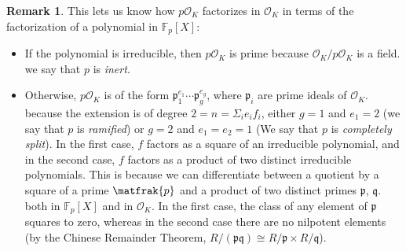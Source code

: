 \documentclass[11pt]{article}
\theoremstyle{definition}
\newtheorem{rk}[theorem]{Remark}
\begin{document}
    \begin{rk}
        This lets us know how $p\mathcal{O}_K$ factorizes in $\mathcal{O}_K$
        in terms of the factorization of a polynomial in $\mathbb{F}_p[X]$:
        \begin{itemize}
            \item If the polynomial is irreducible, then $p\mathcal{O}_K$ is prime because $\mathcal{O}_K / p \mathcal{O}_K$ is a field.
                we say that $p$ is \emph{inert}.
            \item Otherwise, $p\mathcal{O}_K$ is of the form $\mathfrak{p}_1^{e_1} \cdots \mathfrak{p}_g^{e_g}$,
                where $\mathfrak{p}_i$ are prime ideals of $\mathcal{O}_K$.
                because the extension is of degree $2 = n = \varSigma_i e_i f_i$,
                either $g=1$ and $e_1 = 2$ (we say that $p$ is \emph{ramified}) or $g=2$ and $e_1 = e_2 = 1$ (We say that $p$ is \emph{completely split}).
                In the first case, $f$ factors as a square of an irreducible polynomial,
                and in the second case, $f$ factors as a product of two distinct irreducible polynomials.
                This is because we can differentiate between a quotient by a square of a prime $\matfrak{p}$ and a product of two distinct primes $\mathfrak{p}$, $\mathfrak{q}$.
                both in $\mathbb{F}_p[X]$ and in $\mathcal{O}_K$.
                In the first case, the class of any element of $\mathfrak{p}$ squares to zero,
                whereas in the second case there are no nilpotent elements (by the Chinese Remainder Theorem,
                $R/(\mathfrak{p}\mathfrak{q}) \cong R/\mathfrak{p} \times R/\mathfrak{q}$).
        \end{itemize}
    \end{rk}
    
\end{document}
